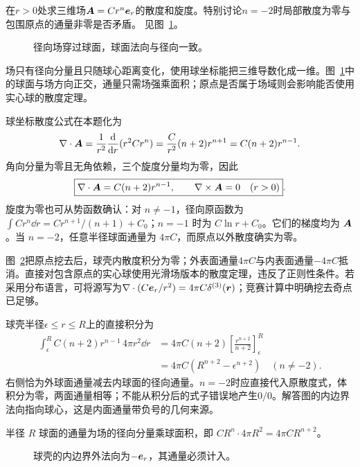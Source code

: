 \begin{exercise}[径向场的散度与奇点]\label{ex:c3-h8}
在$r>0$处求三维场$\bm{A}=C r^n\bm{e}_r$的散度和旋度。特别讨论$n=-2$时局部散度为零与包围原点的通量非零是否矛盾。 见图~\ref{fig:c3-h8-q}。
\end{exercise}

\begin{figure}[H]\centering
{}
\caption{径向场穿过球面，球面法向与径向一致。}\label{fig:c3-h8-q}
\end{figure}
\begin{solution}
场只有径向分量且只随球心距离变化，使用球坐标能把三维导数化成一维。图~\ref{fig:c3-h8-q}中的球面与场方向正交，通量只需场强乘面积；原点是否属于场域则会影响能否使用实心球的散度定理。


球坐标散度公式在本题化为
\[
\nabla\cdot\bm{A}=\frac1{r^2}\frac{\mathop{}\!\mathrm d}{\mathop{}\!\mathrm d r}(r^2Cr^n)
=\frac C{r^2}(n+2)r^{n+1}=C(n+2)r^{n-1}.
\]
角向分量为零且无角依赖，三个旋度分量均为零，因此
\[\boxed{\nabla\cdot\bm{A}=C(n+2)r^{n-1},\qquad
\nabla\times\bm{A}=0\quad(r>0)}.\]
旋度为零也可从势函数确认：对 $n\ne-1$，径向原函数为 $\int Cr^n\dd r=Cr^{n+1}/(n+1)+C_0$；$n=-1$ 时为 $C\ln r+C_0$。它们的梯度均为 $\bm{A}$。当 $n=-2$，任意半径球面通量为 $4\pi C$，而原点以外散度确实为零。

图~\ref{fig:c3-h8-s}把原点挖去后，球壳内散度积分为零；外表面通量$4\pi C$与内表面通量$-4\pi C$抵消。直接对包含原点的实心球使用光滑场版本的散度定理，违反了正则性条件。若采用分布语言，可将源写为$\nabla\cdot(C\bm{e}_r/r^2)=4\pi C\delta^{(3)}(\bm{r})$；竞赛计算中明确挖去奇点已足够。


球壳半径$\epsilon\le r\le R$上的直接积分为
\[\begin{aligned}
\int_\epsilon^R C(n+2)r^{n-1}\,4\pi r^2\dd r
&=4\pi C(n+2)\left[\frac{r^{n+2}}{n+2}\right]_\epsilon^R\\
&=4\pi C(R^{n+2}-\epsilon^{n+2})\quad(n\ne-2).
\end{aligned}\]
右侧恰为外球面通量减去内球面的径向通量。$n=-2$时应直接代入原散度式，体积分为零，两面通量相等；不能从积分后的式子错误地产生$0/0$。解答图的内边界法向指向球心，这是内面通量带负号的几何来源。

半径 $R$ 球面的通量为场的径向分量乘球面积，即 $CR^n\cdot4\pi R^2=4\pi CR^{n+2}$。


\begin{figure}[H]\centering
{}
\caption{球壳的内边界外法向为$-\bm{e}_r$，其通量必须计入。}\label{fig:c3-h8-s}
\end{figure}
\end{solution}

